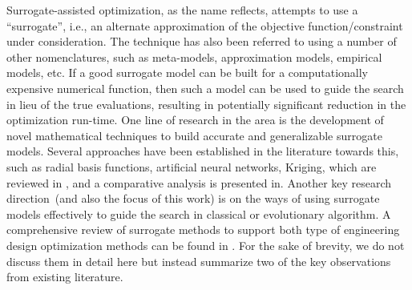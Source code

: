 \documentclass[twocolumn,10pt]{asme2ej}
\begin{document}
Surrogate-assisted optimization, as the name reflects, attempts to use a ``surrogate'', i.e., an alternate approximation of the objective function/constraint under consideration. The technique has also been referred to using a number of other nomenclatures, such as meta-models, approximation models, empirical models, etc. If a good surrogate model can be built for a computationally expensive numerical function, then such a model can be used to guide the search in lieu of the true evaluations, resulting in potentially significant reduction in the optimization run-time.  One line of research in the area is the development of novel mathematical techniques to build accurate and generalizable surrogate models. Several approaches have been established in the literature towards this, such as radial basis functions, artificial neural networks, Kriging, which are reviewed in \cite{KHTjin2005csf,KHTjinswarm2011}, and a comparative analysis is presented in\cite{jin2001comparative}. Another key research direction~(and also the focus of this work) is on the ways of using surrogate models effectively to guide the search in classical or evolutionary algorithm. A comprehensive review of surrogate methods to support both type of engineering design optimization methods can be found in \cite{KHTwangreview2007}. For the sake of brevity, we do not discuss them in detail here but instead summarize two of the key observations from existing literature. 
\vspace{-0.3em}
\end{document}
